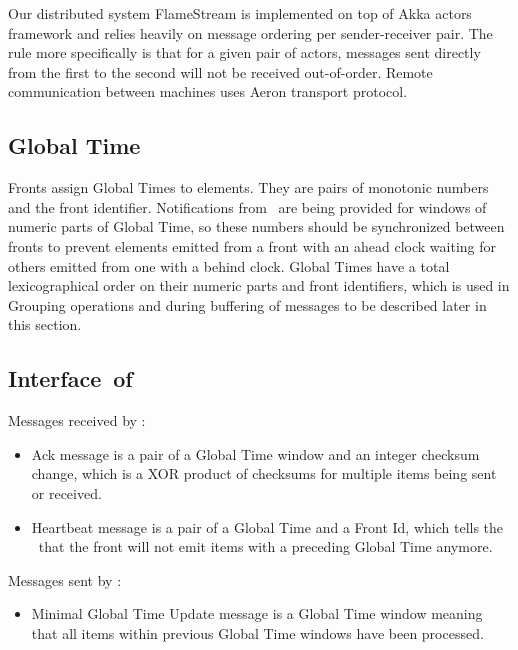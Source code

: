 \label {fs-acker-impl}


Our distributed system FlameStream is implemented on top of Akka actors framework and relies heavily on message ordering per sender-receiver pair. The rule more specifically is that for a given pair of actors, messages sent directly from the first to the second will not be received out-of-order. Remote communication between machines uses Aeron transport protocol.

\subsection{Global Time}

Fronts assign Global Times to elements. They are pairs of monotonic numbers and the front identifier. Notifications from \tracker\ are being provided for windows of numeric parts of Global Time, so these numbers should be synchronized between fronts to prevent elements emitted from a front with an ahead clock waiting for others emitted from one with a behind clock. Global Times have a total lexicographical order on their numeric parts and front identifiers, which is used in Grouping operations and during buffering of messages to be described later in this section.

\subsection{Interface\ of\ \tracker\ }

Messages received by \tracker:
\begin{itemize}
	\item Ack message is a pair of a Global Time window and an integer checksum change, which is a XOR product of checksums for multiple items being sent or received.
	\item Heartbeat message is a pair of a Global Time and a Front Id, which tells the \tracker\ that the front will not emit items with a preceding Global Time anymore.
\end{itemize}
Messages sent by \tracker:
\begin{itemize}
	\item Minimal Global Time Update message is a Global Time window meaning that all items within previous Global Time windows have been processed.
\end{itemize}


